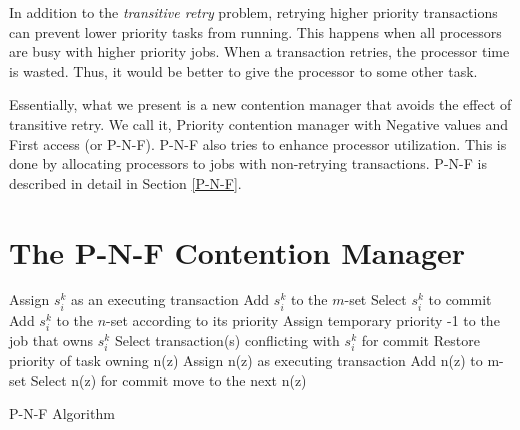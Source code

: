 In addition to the \emph{transitive retry} problem, retrying higher priority transactions can prevent lower priority tasks from running. This happens when all processors are busy with higher priority jobs. When a transaction retries, the processor time is wasted. Thus, it would be better to give the processor to some other task.


Essentially, what we present is a new contention manager that avoids the effect of transitive retry. We call it, Priority contention manager with Negative values and First access (or P-N-F). P-N-F also tries to enhance processor utilization. This is done by allocating processors to jobs with non-retrying transactions. P-N-F is described in detail in Section \ref{P-N-F}.

\section{The P-N-F Contention Manager\label{P-N-F}}

\begin{algorithm}
\footnotesize{
\LinesNumbered
{}
{
Assign $s_i^k$ as an executing transaction\;
Add $s_i^k$ to the $m$-set\;
Select $s_i^k$ to commit
}
{
Add $s_i^k$ to the $n$-set according to its priority\label{move to n}\;
Assign temporary priority -1 to the job that owns $s_i^k$ \label{priority to -1}\;
Select transaction(s) conflicting with $s_i^k$ for commit\label{s_i^k commit}\;
}
{
	{
		{
			{
				Restore priority of task owning n(z)\;
				Assign n(z) as executing transaction\;
				Add n(z) to m-set\;
				Select n(z) for commit\;
			}
		}
		move to the next n(z)\;
	}
}
}
\caption{P-N-F Algorithm} \label{P-N-F-algorithm}
\end{algorithm}

